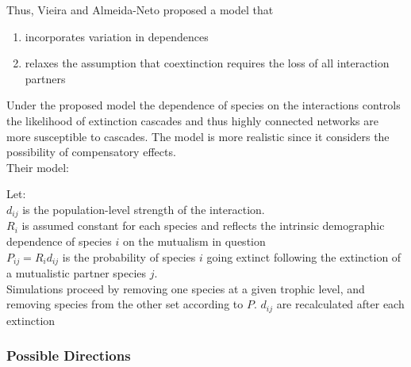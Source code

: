 \documentclass[12pt]{article}
\begin{document}
Thus, Vieira and Almeida-Neto proposed a model that
\begin{enumerate}
	\item incorporates variation in dependences
	\item relaxes the assumption that coextinction requires the loss of all interaction partners
\end{enumerate}

Under the proposed model the dependence of species on the interactions controls the likelihood of extinction cascades and thus highly connected networks are more susceptible to cascades. The model is more realistic since it considers the possibility of compensatory effects.\\

Their model:

Let:\\
$d_{ij}$ is the population-level strength of the interaction.\\
$R_i$ is assumed constant for each species and reflects the intrinsic demographic dependence of species $i$ on the mutualism in question\\
$P_{ij} = R_i d_{ij}$ is the probability of species $i$ going extinct following the extinction of a mutualistic partner species $j$.\\

Simulations proceed by removing one species at a given trophic level, and removing species from the other set according to $P$. $d_{ij}$ are recalculated after each extinction


\subsubsection*{Possible Directions}
\end{document}
